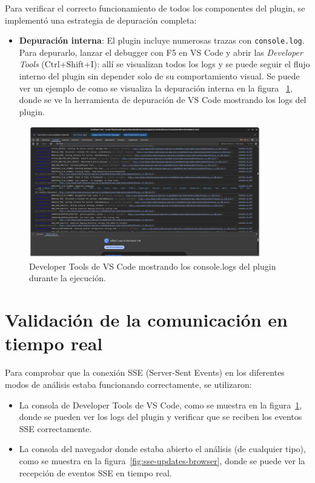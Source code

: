 \documentclass[a4paper, 12pt]{book}
\begin{document}
Para verificar el correcto funcionamiento de todos los componentes del plugin, se implementó una estrategia de depuración completa:

\begin{itemize}
  \item \textbf{Depuración interna}: El plugin incluye numerosas trazas con \texttt{console.log}. Para depurarlo, lanzar el debugger con F5 en VS Code y abrir las \emph{Developer Tools} (Ctrl+Shift+I): allí se visualizan todos los logs y se puede seguir el flujo interno del plugin sin depender solo de su comportamiento visual. Se puede ver un ejemplo de como se visualiza la depuración interna en la figura ~\ref{fig:developer-tools-logs}, donde se ve la herramienta de depuración de VS Code mostrando los logs del plugin.
\end{itemize}

\begin{figure}[H]
\centering
\includegraphics[width=0.9\textwidth]{img/developer-tools-logs.png}
\caption{Developer Tools de VS Code mostrando los console.logs del plugin durante la ejecución.}
\label{fig:developer-tools-logs}
\end{figure}

\section{Validación de la comunicación en tiempo real}
\label{sec:validacion-tiempo-real}

Para comprobar que la conexión SSE (Server-Sent Events) en los diferentes modos de análisis estaba funcionando correctamente, se utilizaron:

\begin{itemize}
  \item La consola de Developer Tools de VS Code, como se muestra en la figura~\ref{fig:developer-tools-logs}, donde se pueden ver los logs del plugin y verificar que se reciben los eventos SSE correctamente.
  \item La consola del navegador donde estaba abierto el análisis (de cualquier tipo), como se muestra en la figura~\ref{fig:sse-updates-browser}, donde se puede ver la recepción de eventos SSE en tiempo real.
\end{itemize}
\end{document}

